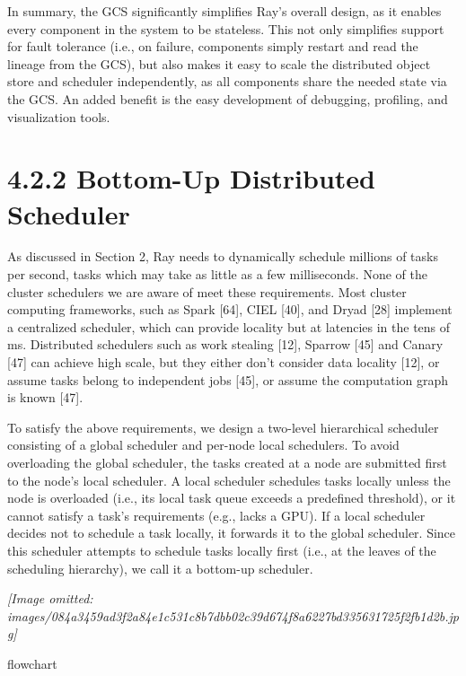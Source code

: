 \documentclass[
]{article}
\begin{document}
In summary, the GCS significantly simplifies Ray's overall design, as it
enables every component in the system to be stateless. This not only
simplifies support for fault tolerance (i.e., on failure, components
simply restart and read the lineage from the GCS), but also makes it
easy to scale the distributed object store and scheduler independently,
as all components share the needed state via the GCS. An added benefit
is the easy development of debugging, profiling, and visualization
tools.

\section{4.2.2 Bottom-Up Distributed
Scheduler}\label{bottom-up-distributed-scheduler}

As discussed in Section 2, Ray needs to dynamically schedule millions of
tasks per second, tasks which may take as little as a few milliseconds.
None of the cluster schedulers we are aware of meet these requirements.
Most cluster computing frameworks, such as Spark {[}64{]}, CIEL
{[}40{]}, and Dryad {[}28{]} implement a centralized scheduler, which
can provide locality but at latencies in the tens of ms. Distributed
schedulers such as work stealing {[}12{]}, Sparrow {[}45{]} and Canary
{[}47{]} can achieve high scale, but they either don't consider data
locality {[}12{]}, or assume tasks belong to independent jobs {[}45{]},
or assume the computation graph is known {[}47{]}.

To satisfy the above requirements, we design a two-level hierarchical
scheduler consisting of a global scheduler and per-node local
schedulers. To avoid overloading the global scheduler, the tasks created
at a node are submitted first to the node's local scheduler. A local
scheduler schedules tasks locally unless the node is overloaded (i.e.,
its local task queue exceeds a predefined threshold), or it cannot
satisfy a task's requirements (e.g., lacks a GPU). If a local scheduler
decides not to schedule a task locally, it forwards it to the global
scheduler. Since this scheduler attempts to schedule tasks locally first
(i.e., at the leaves of the scheduling hierarchy), we call it a
bottom-up scheduler.

\textit{[Image omitted: images/084a3459ad3f2a84e1c531c8b7dbb02c39d674f8a6227bd335631725f2fb1d2b.jpg]}

flowchart
\end{document}
